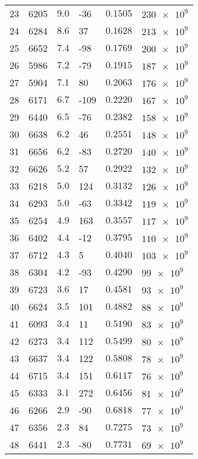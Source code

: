 \documentclass[a4paper,german,12pt,smallheadings]{scrartcl}
\begin{document}
\begin{enumerate}[a)]
\begin{longtable}{|l|l|l|l|l|l|}
    23 & 6205 & $\num{ 9.0}$ & -36  & $\num{0.1505}$ & $\num{230e9}$ \\
    24 & 6284 & $\num{ 8.6}$ & 37   & $\num{0.1628}$ & $\num{213e9}$ \\
    25 & 6652 & $\num{ 7.4}$ & -98  & $\num{0.1769}$ & $\num{200e9}$ \\
    26 & 5986 & $\num{ 7.2}$ & -79  & $\num{0.1915}$ & $\num{187e9}$ \\
    27 & 5904 & $\num{ 7.1}$ & 80   & $\num{0.2063}$ & $\num{176e9}$ \\
    28 & 6171 & $\num{ 6.7}$ & -109 & $\num{0.2220}$ & $\num{167e9}$ \\
    29 & 6440 & $\num{ 6.5}$ & -76  & $\num{0.2382}$ & $\num{158e9}$ \\
    30 & 6638 & $\num{ 6.2}$ & 46   & $\num{0.2551}$ & $\num{148e9}$ \\
    31 & 6656 & $\num{ 6.2}$ & -83  & $\num{0.2720}$ & $\num{140e9}$ \\
    32 & 6626 & $\num{ 5.2}$ & 57   & $\num{0.2922}$ & $\num{132e9}$ \\
    33 & 6218 & $\num{ 5.0}$ & 124  & $\num{0.3132}$ & $\num{126e9}$ \\
    34 & 6293 & $\num{ 5.0}$ & -63  & $\num{0.3342}$ & $\num{119e9}$ \\
    35 & 6254 & $\num{ 4.9}$ & 163  & $\num{0.3557}$ & $\num{117e9}$ \\
    36 & 6402 & $\num{ 4.4}$ & -12  & $\num{0.3795}$ & $\num{110e9}$ \\
    37 & 6712 & $\num{ 4.3}$ & 5    & $\num{0.4040}$ & $\num{103e9}$ \\
    38 & 6304 & $\num{ 4.2}$ & -93  & $\num{0.4290}$ & $\num{ 99e9}$ \\
    39 & 6723 & $\num{ 3.6}$ & 17   & $\num{0.4581}$ & $\num{ 93e9}$ \\
    40 & 6624 & $\num{ 3.5}$ & 101  & $\num{0.4882}$ & $\num{ 88e9}$ \\
    41 & 6093 & $\num{ 3.4}$ & 11   & $\num{0.5190}$ & $\num{ 83e9}$ \\
    42 & 6273 & $\num{ 3.4}$ & 112  & $\num{0.5499}$ & $\num{ 80e9}$ \\
    43 & 6637 & $\num{ 3.4}$ & 122  & $\num{0.5808}$ & $\num{ 78e9}$ \\
    44 & 6715 & $\num{ 3.4}$ & 151  & $\num{0.6117}$ & $\num{ 76e9}$ \\
    45 & 6333 & $\num{ 3.1}$ & 272  & $\num{0.6456}$ & $\num{ 81e9}$ \\
    46 & 6266 & $\num{ 2.9}$ & -90  & $\num{0.6818}$ & $\num{ 77e9}$ \\
    47 & 6356 & $\num{ 2.3}$ & 84   & $\num{0.7275}$ & $\num{ 73e9}$ \\
    48 & 6441 & $\num{ 2.3}$ & -80  & $\num{0.7731}$ & $\num{ 69e9}$ \\
    \hline
    \end{longtable}


\end{enumerate}
\end{document}
